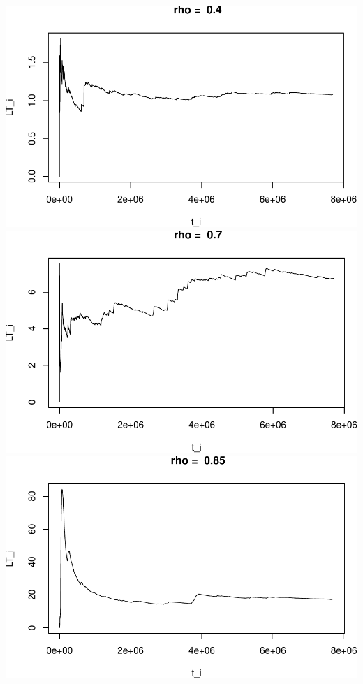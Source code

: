 \documentclass[]{article}
\begin{document}
\includegraphics{003_files/figure-latex/unnamed-chunk-10-1.pdf}
\includegraphics{003_files/figure-latex/unnamed-chunk-10-2.pdf}
\includegraphics{003_files/figure-latex/unnamed-chunk-10-3.pdf}
\end{document}
